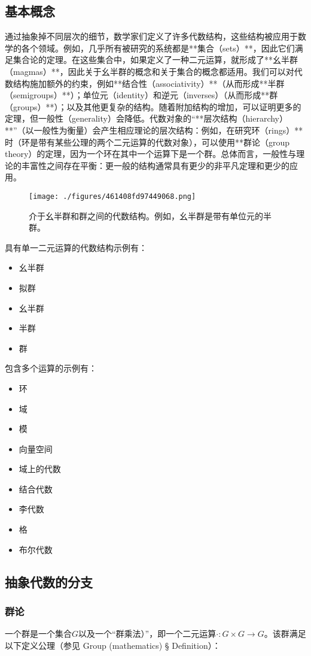 \subsection{基本概念}
通过抽象掉不同层次的细节，数学家们定义了许多代数结构，这些结构被应用于数学的各个领域。例如，几乎所有被研究的系统都是**集合（sets）**，因此它们满足集合论的定理。在这些集合中，如果定义了一种二元运算，就形成了**幺半群（magmas）**，因此关于幺半群的概念和关于集合的概念都适用。我们可以对代数结构施加额外的约束，例如**结合性（associativity）**（从而形成**半群（semigroups）**）；单位元（identity）和逆元（inverses）（从而形成**群（groups）**）；以及其他更复杂的结构。随着附加结构的增加，可以证明更多的定理，但一般性（generality）会降低。代数对象的“**层次结构（hierarchy）**”（以一般性为衡量）会产生相应理论的层次结构：例如，在研究\*\*环（rings）**时（环是带有某些公理的两个二元运算的代数对象），可以使用**群论（group theory）\*\*的定理，因为一个环在其中一个运算下是一个群。总体而言，一般性与理论的丰富性之间存在平衡：更一般的结构通常具有更少的非平凡定理和更少的应用。
\begin{figure}[ht]
\centering
\texttt{[image: ./figures/461408fd97449068.png]}
\caption{介于幺半群和群之间的代数结构。例如，幺半群是带有单位元的半群。} \label{fig_CXds_2}
\end{figure}
具有单一二元运算的代数结构示例有：
\begin{itemize}
\item 幺半群
\item 拟群
\item 幺半群
\item 半群
\item 群
\end{itemize}
包含多个运算的示例有：
\begin{itemize}
\item 环
\item 域
\item 模
\item 向量空间
\item 域上的代数
\item 结合代数
\item 李代数
\item 格
\item 布尔代数
\end{itemize}
\subsection{抽象代数的分支}
\subsubsection{群论}
一个群是一个集合$G$以及一个“群乘法）”，即一个二元运算$\cdot : G \times G \rightarrow G$。该群满足以下定义公理（参见 Group (mathematics) § Definition）：  


